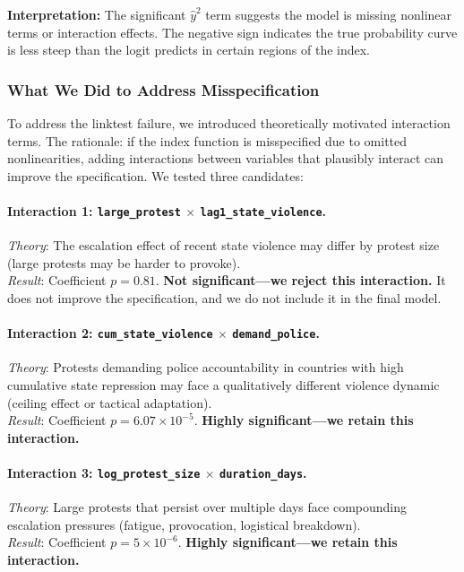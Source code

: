 \documentclass[12pt,a4paper]{article}
\begin{document}
\textbf{Interpretation:} The significant $\hat{y}^2$ term suggests the model is missing nonlinear terms or interaction effects. The negative sign indicates the true probability curve is less steep than the logit predicts in certain regions of the index.

\subsubsection{What We Did to Address Misspecification}

To address the linktest failure, we introduced theoretically motivated interaction terms. The rationale: if the index function is misspecified due to omitted nonlinearities, adding interactions between variables that plausibly interact can improve the specification. We tested three candidates:

\paragraph{Interaction 1: \texttt{large\_protest} $\times$ \texttt{lag1\_state\_violence}.}
\emph{Theory}: The escalation effect of recent state violence may differ by protest size (large protests may be harder to provoke).\\
\emph{Result}: Coefficient $p = 0.81$. \textbf{Not significant---we reject this interaction.} It does not improve the specification, and we do not include it in the final model.

\paragraph{Interaction 2: \texttt{cum\_state\_violence} $\times$ \texttt{demand\_police}.}
\emph{Theory}: Protests demanding police accountability in countries with high cumulative state repression may face a qualitatively different violence dynamic (ceiling effect or tactical adaptation).\\
\emph{Result}: Coefficient $p = 6.07 \times 10^{-5}$. \textbf{Highly significant---we retain this interaction.}

\paragraph{Interaction 3: \texttt{log\_protest\_size} $\times$ \texttt{duration\_days}.}
\emph{Theory}: Large protests that persist over multiple days face compounding escalation pressures (fatigue, provocation, logistical breakdown).\\
\emph{Result}: Coefficient $p = 5 \times 10^{-6}$. \textbf{Highly significant---we retain this interaction.}
\end{document}
